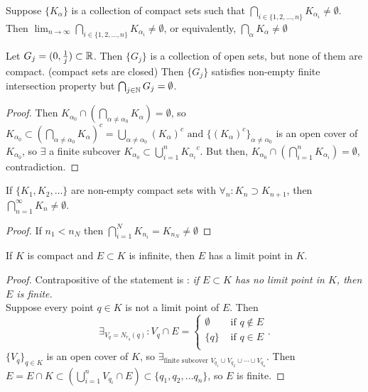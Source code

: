 \begin{thm}[36]
	Suppose $\{K_\alpha\} $ is a collection of compact sets such that $\bigcap_{i \in \{1,2, \ldots, n\} } K_{\alpha_i} \neq \emptyset$. Then
	$\lim_{n\to \infty}{\bigcap_{i \in \{1,2, \ldots ,n\}}K_{\alpha_i}}\neq \emptyset$, or equivalently, $\bigcap_{\alpha} K_{\alpha} \neq \emptyset $
	\begin{example}
		Let $G_j=(0,\frac{1}{j}) \subset \mathbb{R}$. Then $\{G_j\}$ is a collection of open sets, but none of them are compact. (compact sets are closed)
		Then $\{G_j\}$ satisfies non-empty finite intersection property but $\bigcap_{j \in \mathbb{N} }G_j=\emptyset$.
	\end{example}
	\begin{proof}
		Then $K_{\alpha_0} \cap \left( \bigcap_{\alpha\neq \alpha_0}K_{\alpha} \right)=\emptyset$, so $K_{\alpha_0} \subset \left( \bigcap_{\alpha\neq \alpha_0}K_{\alpha}\right)^{c}=\bigcup_{\alpha\neq \alpha_0}\left( K_{\alpha}\right)^{c} \text{ and } \{\left( K_{\alpha} \right)^{c}\}_{\alpha\neq \alpha_0}$ is an open cover of $K_{\alpha_0}$, so $\exists$ a finite subcover $K_{\alpha_0} \subset \bigcup_{i=1}^{n} {K_{\alpha_i}}^{c} $. But then, $K_{\alpha_0} \cap  \left(\bigcap_{i=1}^{n}K_{\alpha_i}   \right)=\emptyset  $, contradiction.
	\end{proof}
	\begin{corollary}
		If $\{K_1,K_2, \ldots \} $ are non-empty compact sets with $\forall_{n}: K_n \supset K_{n+1}$, then $\bigcap_{n=1}^{\infty}K_n \neq \emptyset$.
	\end{corollary}
	\begin{proof}
		If $n_1<n_N$ then $\bigcap_{i=1}^{N}K_{n_i}=K_{n_N}\neq \emptyset $
	\end{proof}

\end{thm}

\begin{thm}[37]
	If $K$ is compact and $E \subset K$ is infinite, then $E$ has a limit point in $K$.
	\begin{proof}
		Contrapositive of the statement is : \textit{if $E \subset K$ has no limit point in $K$, then $E$ is finite.}\\
		Suppose every point $q \in K$ is not a limit point of $E$.
		Then \[\exists_{V_q= N_{r_q}(q)}: V_q \cap E =
			\begin{cases}
				\emptyset & \text{ if $q \not\in E$} \\
				\{q\}     & \text{ if $q \in E$}     \\
			\end{cases}
			.\]
		$\{V_q\}_{q \in K}$ is an open cover of $K$, so $\exists_{\text{finite subcover } V_{q_1} \cup V_{q_2}\cup  \cdots \cup V_{q_n}}$. Then $E=E \cap K \subset \left( \bigcup_{i=1}^{n}{V_{q_i}} \cap  E \right) \subset \{q_1,q_2, \ldots q_n\} $, so $E$ is finite.

	\end{proof}
\end{thm}

